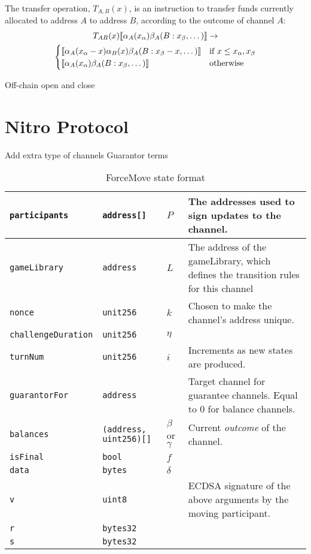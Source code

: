 The transfer operation, $T_{A,B}(x)$, is an instruction to transfer funds currently allocated
to address $A$ to address $B$, according to the outcome of channel $A$:
\begin{multline*}
T_{AB}(x) \llbracket \alpha_A(x_\alpha)\beta_A(B:x_\beta, \dots) \rrbracket \rightarrow \\
  \begin{cases}
      \llbracket \alpha_A(x_\alpha - x)\alpha_B(x)\beta_A(B:x_\beta - x, \dots) \rrbracket & 
      \text{if } x \leq x_\alpha, x_\beta \\
      \llbracket \alpha_A(x_\alpha)\beta_A(B:x_\beta, \dots) \rrbracket &
      \text{otherwise}
  \end{cases}
\end{multline*}



Off-chain open and close


\section{Nitro Protocol}

Add extra type of channels
Guarantor terms

\begin{table}[h]
  \begin{tabular}{|l|l|l|p{5cm}|}
    \hline
    \texttt{participants} & \texttt{address[]} & $P$ & The addresses used to sign updates to the channel. \\ \hline
    \texttt{gameLibrary} & \texttt{address} & $L$ & The address of the gameLibrary, which defines the transition rules for this channel \\ \hline
    \texttt{nonce} & \texttt{unit256} & $k$ & Chosen to make the channel's address unique. \\ \hline
    \texttt{challengeDuration} & \texttt{unit256} & $\eta$ & \\ \hline
    \texttt{turnNum} & \texttt{unit256} & $i$ & Increments as new states are produced. \\ \hline
    \texttt{guarantorFor} & \texttt{address} &  & Target channel for guarantee channels. Equal to 0 for balance channels. \\ \hline
    \texttt{balances} & \texttt{(address, uint256)[]} & $\beta$ or $\gamma$ & Current \textit{outcome} of the channel. \\ \hline
    \texttt{isFinal} & \texttt{bool} & $f$ & \\ \hline
    \texttt{data} & \texttt{bytes} & $\delta$ & \\ \hline
    \texttt{v} & \texttt{uint8} & &  ECDSA signature of the above arguments by the moving participant. \\ \cline{1-2}
    \texttt{r} & \texttt{bytes32} & & \\ \cline{1-2}
    \texttt{s} & \texttt{bytes32} & & \\ \hline
  \end{tabular}
  \caption{ForceMove state format}
  \label{table:force-move-state}
\end{table}

